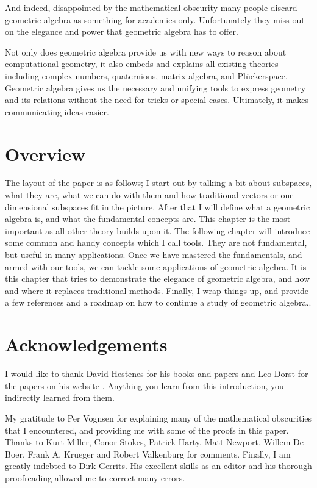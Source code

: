\documentclass[10pt]{report}
\begin{document}
And indeed, disappointed by the mathematical obscurity many people
discard geometric algebra as something for academics only.
Unfortunately they miss out on the elegance and power that
geometric algebra has to offer.

Not only does geometric algebra provide us with new ways to reason
about computational geometry, it also embeds and explains all
existing theories including complex numbers, quaternions,
matrix-algebra, and Pl\"uckerspace. Geometric algebra gives us the
necessary and unifying tools to express geometry and its relations
without the need for tricks or special cases. Ultimately, it makes
communicating ideas easier.

\section{Overview}

The layout of the paper is as follows; I start out by talking a
bit about subspaces, what they are, what we can do with them and
how traditional vectors or one-dimensional subspaces fit in the
picture. After that I will define what a geometric algebra is, and
what the fundamental concepts are. This chapter is the most
important as all other theory builds upon it. The following
chapter will introduce some common and handy concepts which I call
tools. They are not fundamental, but useful in many applications.
Once we have mastered the fundamentals, and armed with our tools,
we can tackle some applications of geometric algebra. It is this
chapter that tries to demonstrate the elegance of geometric
algebra, and how and where it replaces traditional methods.
Finally, I wrap things up, and provide a few references and a
roadmap on how to continue a study of geometric algebra..

\section{Acknowledgements}

I would like to thank David Hestenes for his books
\cite{bib:hestenes clifford algebra} \cite{bib:hestenes new
foundations} and papers \cite{bib:hestenes website} and Leo Dorst
for the papers on his website \cite{bib:dorst website}. Anything
you learn from this introduction, you indirectly learned from
them.

My gratitude to Per Vognsen for explaining many of the
mathematical obscurities that I encountered, and providing me with
some of the proofs in this paper. Thanks to Kurt Miller, Conor
Stokes, Patrick Harty, Matt Newport, Willem De Boer, Frank A.
Krueger and Robert Valkenburg for comments. Finally, I am greatly
indebted to Dirk Gerrits. His excellent skills as an editor and
his thorough proofreading allowed me to correct many errors.
\end{document}
